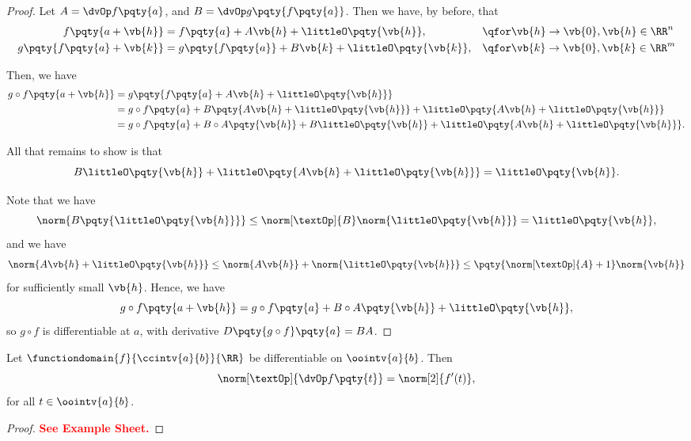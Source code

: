 \begin{proof}
    Let \(A = \dvOp f\pqty{a}\), and \(B = \dvOp g\pqty{f\pqty{a}}\). Then we have, by before, that
    \begin{align*}
        f\pqty{a + \vb{h}} &= f\pqty{a} + A \vb{h} + \littleO\pqty{\vb{h}}, && \qfor \vb{h} \to \vb{0}, \vb{h} \in \RR^n \\
        g\pqty{f\pqty{a} + \vb{k}} &= g\pqty{f\pqty{a}} + B \vb{k} + \littleO\pqty{\vb{k}}, && \qfor \vb{k} \to \vb{0}, \vb{k} \in \RR^m \\
    \end{align*}

    Then, we have
    \begin{align*}
        g \circ f \pqty{a + \vb{h}} &= g \pqty{f\pqty{a} + A \vb{h} + \littleO\pqty{\vb{h}}} \\
        &= g \circ f \pqty{a} + B \pqty{A \vb{h} + \littleO\pqty{\vb{h}}} + \littleO\pqty{A \vb{h} + \littleO\pqty{\vb{h}}} \\
        &= g \circ f \pqty{a} + B \circ A \pqty{\vb{h}} + B \littleO\pqty{\vb{h}} + \littleO\pqty{A \vb{h} + \littleO\pqty{\vb{h}}}.
    \end{align*}

    All that remains to show is that
    \[
        B \littleO\pqty{\vb{h}} + \littleO\pqty{A \vb{h} + \littleO\pqty{\vb{h}}} = \littleO \pqty{\vb{h}}.
    \]

    Note that we have
    \[
        \norm{B \pqty{\littleO\pqty{\vb{h}}}} \leq \norm[\textOp]{B} \norm{\littleO\pqty{\vb{h}}} = \littleO\pqty{\vb{h}},
    \]
    and we have
    \[
        \norm{A\vb{h} + \littleO\pqty{\vb{h}}} \leq \norm{A \vb{h}} + \norm{\littleO\pqty{\vb{h}}} \leq \pqty{\norm[\textOp]{A} + 1} \norm{\vb{h}}
    \]
    for sufficiently small \(\vb{h}\). Hence, we have
    \[
        g \circ f \pqty{a + \vb{h}} = g \circ f \pqty{a} + B \circ A \pqty{\vb{h}} + \littleO\pqty{\vb{h}},
    \]
    so \(g \circ f\) is differentiable at \(a\), with derivative \(D\pqty{g \circ f} \pqty{a} = BA\).
\end{proof}

\begin{lemma}
    Let \(\functiondomain{f}{\ccintv{a}{b}}{\RR}\) be differentiable on \(\oointv{a}{b}\). Then
    \[
        \norm[\textOp]{\dvOp f\pqty{t}} = \norm[2]{f'(t)},
    \]
    for all \(t \in \oointv{a}{b}\).
\end{lemma}

\begin{proof}
    \textbf{\textcolor{red}{See Example Sheet.}}
\end{proof}

